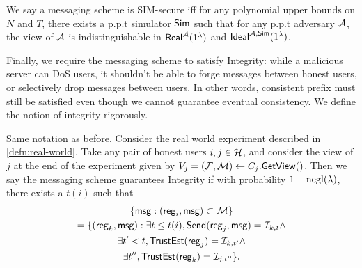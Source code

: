 \begin{definition}
\label{defn:SIM-secure}
We say a messaging scheme is SIM-secure iff for  any polynomial upper bounds on $N$ and $T$, there exists a p.p.t simulator $\mathsf{Sim}$ such that for any p.p.t adversary $\mathcal{A}$, the view of $\mathcal{A}$ is indistinguishable in $\mathsf{Real}^{\mathcal{A}}(1^{\lambda})$ and $\mathsf{Ideal}^{\mathcal{A}, \mathsf{\mathsf{Sim}}}(1^{\lambda})$.
\end{definition}

Finally, we require the messaging scheme to satisfy Integrity: while a malicious server can DoS users, it shouldn't be able to forge messages between honest users, or selectively drop messages between users. In other words, consistent prefix must still be satisfied even though we cannot guarantee eventual consistency. We define the notion of integrity rigorously.
\begin{definition}[Integrity]
\label{defn:integrity}
Same notation as before. Consider the real world experiment described in \cref{defn:real-world}. Take any pair of honest users $i, j \in \mathcal{H}$, and consider the view of $j$ at the end of the experiment given by $V_j = (\mathcal{F}, \mathcal{M}) \leftarrow C_j.\mathsf{GetView}()$.  Then we say the messaging scheme guarantees Integrity if with probability $1 - \operatorname{negl}(\lambda)$, there exists a $t(i)$ such that
\begin{multline*}
     \{\mathsf{msg} : (\mathsf{reg}_i, \mathsf{msg}) \subset \mathcal{M}\} \\
      = \{(\mathsf{reg}_k, \mathsf{msg}): \exists t \leq t(i), \mathsf{Send}(\mathsf{reg}_j, \mathsf{msg}) = \mathcal{I}_{k, t} \land \\
             \exists t' < t, \mathsf{TrustEst}(\mathsf{reg}_j) = \mathcal{I}_{k, t'} \land \\
             \exists t'', \mathsf{TrustEst}(\mathsf{reg}_k) = \mathcal{I}_{j, t''}\}. \\   
\end{multline*}
\end{definition}